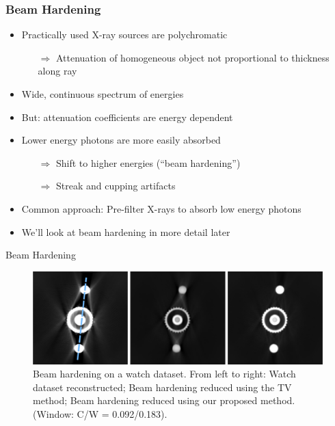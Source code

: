 \begin{frame}
	\frametitle{Beam Hardening}

	\begin{itemize}
		\setlength\itemsep{0.3cm}
		\item Practically used X-ray sources are polychromatic
		      \begin{itemize}
			      \item[$\Rightarrow$] Attenuation of homogeneous object not proportional to thickness along ray
		      \end{itemize}
		\item Wide, continuous spectrum of energies
		\item But: attenuation coefficients are energy dependent
		\item Lower energy photons are more easily absorbed
		      \begin{itemize}
			      \item[$\Rightarrow$] Shift to higher energies (``beam hardening'')
			      \item[$\Rightarrow$] Streak and cupping artifacts
		      \end{itemize}
		\item Common approach: Pre-filter X-rays to absorb low energy photons
		\item We'll look at beam hardening in more detail later
	\end{itemize}

\end{frame}

\begin{frame}[t]{Beam Hardening}
	\begin{figure}[htpb]
		\centering
		\includegraphics[height=0.6\textheight]{images/beam_hardening.png}
		\caption{Beam hardening on a watch dataset. From left to right: Watch dataset reconstructed; Beam hardening reduced using the TV method; Beam hardening reduced using our proposed method. (Window: C/W = 0.092/0.183).}%
	\end{figure}
	\flushright{}
	\tiny
\end{frame}

